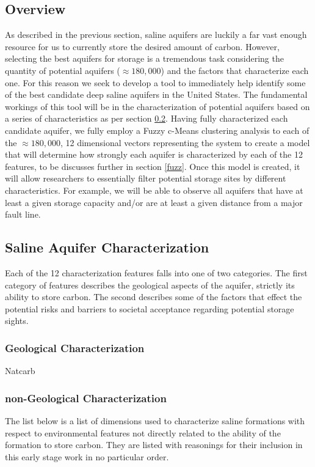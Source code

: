 \documentclass[a4paper, 12pt]{article}
\begin{document}
\subsection{Overview}
As described in the previous section, saline aquifers are luckily a far vast enough resource for us to currently store the desired amount of carbon. However, selecting the best aquifers for storage is a tremendous task considering the quantity of potential aquifers ($\approx180,000$) and the factors that characterize each one. For this reason we seek to develop a tool to immediately help identify some of the best candidate deep saline aquifers in the United States. 
The fundamental workings of this tool will be in the characterization of potential aquifers based on a series of characteristics as per section \ref{wellchar}. Having fully characterized each candidate aquifer, we fully employ a Fuzzy c-Means clustering analysis to each of the $\approx180,000$, 12 dimensional vectors representing the system to create a model that will determine how strongly each aquifer is characterized by each of the 12 features, to be discusses further in section \ref{fuzz}. Once this model is created, it will allow researchers to essentially filter potential storage sites by different characteristics. For example, we will be able to observe all aquifers that have at least a given storage capacity and/or are at least a given distance from a major fault line.  

\subsection{Saline Aquifer Characterization} \label{wellchar}
Each of the 12 characterization features falls into one of two categories. The first category of features describes the geological aspects of the aquifer, strictly its ability to store carbon. The second describes some of the factors that effect the potential risks and barriers to societal acceptance regarding potential storage sights. 

\subsubsection{Geological Characterization}
Natcarb

\subsubsection{non-Geological Characterization}

The list below is a list of dimensions used to characterize saline formations with respect to environmental features not directly related to the ability of the formation to store carbon.
They are listed with reasonings for their inclusion in this early stage work in no particular order. 
\end{document}
